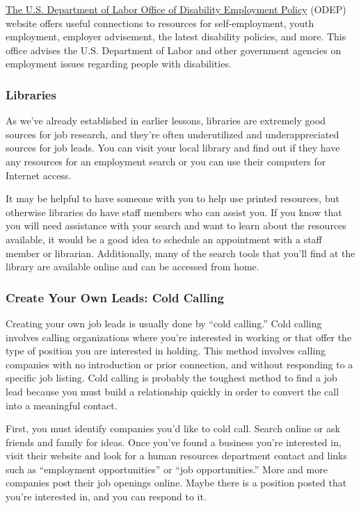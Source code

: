 \href{https://www.dol.gov/agencies/odep}{The U.S. Department of Labor Office of Disability Employment Policy} (ODEP) website offers useful connections to resources for self-employment, youth employment, employer advisement, the latest disability policies, and more. This office advises the U.S. Department of Labor and other government agencies on employment issues regarding people with disabilities.

\subsubsection*{Libraries}

As we've already established in earlier lessons, libraries are extremely good sources for job research, and they're often underutilized and underappreciated sources for job leads. You can visit your local library and find out if they have any resources for an employment search or you can use their computers for Internet access.

It may be helpful to have someone with you to help use printed resources, but otherwise libraries do have staff members who can assist you. If you know that you will need assistance with your search and want to learn about the resources available, it would be a good idea to schedule an appointment with a staff member or librarian. Additionally, many of the search tools that you'll find at the library are available online and can be accessed from home.

\subsubsection*{Create Your Own Leads: Cold Calling}

Creating your own job leads is usually done by ``cold calling.'' Cold calling involves calling organizations where you're interested in working or that offer the type of position you are interested in holding. This method involves calling companies with no introduction or prior connection, and without responding to a specific job listing. Cold calling is probably the toughest method to find a job lead because you must build a relationship quickly in order to convert the call into a meaningful contact.

First, you must identify companies you'd like to cold call. Search online or ask friends and family for ideas. Once you've found a business you're interested in, visit their website and look for a human resources department contact and links such as ``employment opportunities'' or ``job opportunities.'' More and more companies post their job openings online. Maybe there is a position posted that you're interested in, and you can respond to it.


